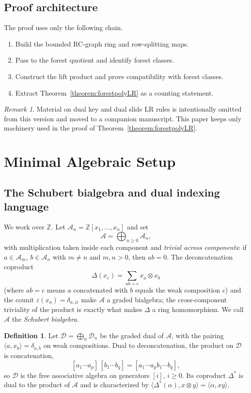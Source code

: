 \documentclass{amsart}
\theoremstyle{definition}
\newtheorem{definition}[theorem]{Definition}
\theoremstyle{remark}
\newtheorem{remark}[theorem]{Remark}
\newcommand{\dcoma}{\mathcal{D}}
\newcommand{\coma}{\mathcal{A}}
\begin{document}
\subsection*{Proof architecture}
The proof uses only the following chain.
\begin{enumerate}
\item Build the bounded RC-graph ring and row-splitting maps.
\item Pass to the forest quotient and identify forest classes.
\item Construct the lift product and prove compatibility with forest classes.
\item Extract Theorem~\ref{theorem:forestpolyLR} as a counting statement.
\end{enumerate}

\begin{remark}
Material on dual key and dual slide LR rules is intentionally omitted from this version and moved to a companion manuscript. This paper keeps only machinery used in the proof of Theorem~\ref{theorem:forestpolyLR}.
\end{remark}

\section{Minimal Algebraic Setup}

\subsection{The Schubert bialgebra and dual indexing language}

We work over $\mathbb{Z}$. Let $\coma_n=\mathbb{Z}[x_1,\ldots,x_n]$ and set
\[
\coma=\bigoplus_{n\geq 0}\coma_n,
\]
with multiplication taken inside each component and \emph{trivial across components}: if $a\in\coma_m$, $b\in\coma_n$ with $m\neq n$ and $m,n>0$, then $ab=0$. The deconcatenation coproduct
\[
\Delta(x_c)=\sum_{ab=c} x_a\otimes x_b
\]
(where $ab=c$ means $a$ concatenated with $b$ equals the weak composition $c$) and the counit $\varepsilon(x_a)=\delta_{a,\varnothing}$ make $\coma$ a graded bialgebra; the cross-component triviality of the product is exactly what makes $\Delta$ a ring homomorphism. We call $\coma$ the \emph{Schubert bialgebra}.

\begin{definition}\label{definition:dualalgebra}
Let $\dcoma=\bigoplus_n\dcoma_n$ be the graded dual of $\coma$, with the pairing $\langle a,x_b\rangle=\delta_{a,b}$ on weak compositions. Dual to deconcatenation, the product on $\dcoma$ is concatenation,
\[
[a_1\cdots a_p]\,[b_1\cdots b_q]=[a_1\cdots a_p b_1\cdots b_q],
\]
so $\dcoma$ is the free associative algebra on generators $[i]$, $i\geq 0$. Its coproduct $\Delta^*$ is dual to the product of $\coma$ and is characterized by $\langle\Delta^*(\alpha),x\otimes y\rangle=\langle\alpha,xy\rangle$.
\end{definition}
\end{document}
